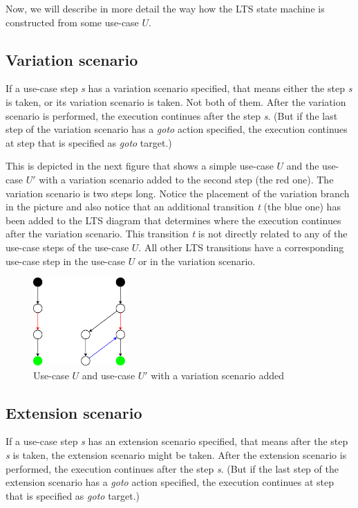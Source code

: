 Now, we will describe in more detail the way how the \ac{LTS} state machine is constructed from some use-case $U$.

\subsection{Variation scenario}
If a use-case step \emph{s} has a variation scenario specified, that means either the step \emph{s} is taken, or its variation scenario is
taken. Not both of them. After the variation scenario is performed, the execution continues after the step \emph{s}. (But if the
last step of the variation scenario has a \emph{goto} action specified, the execution continues at step that is specified as
\emph{goto} target.)

This is depicted in the next figure that shows a simple use-case $U$ and the use-case $U'$ with a variation
scenario added to the second step (the red one). The variation scenario is two steps long.
Notice the placement of the variation branch in the picture and also notice that an additional transition \emph{t} (the blue one)
has been added to the \ac{LTS} diagram that determines where the execution continues after the variation scenario. This transition
\emph{t} is not directly related to any of the use-case steps of the use-case $U$. All other \ac{LTS} transitions have a
corresponding use-case step in the use-case $U$ or in the variation scenario.

\begin{figure}[ht]
  \centering
  \includegraphics[width=100pt]{images/variation}
  \caption{Use-case $U$ and use-case $U'$ with a variation scenario added}
  \label{fig:VariationScenario}
\end{figure}

\subsection{Extension scenario}
If a use-case step \emph{s} has an extension scenario specified, that means after the step \emph{s} is taken, the extension scenario
might be taken. After the extension scenario is performed, the execution continues after the step \emph{s}. (But if the
last step of the extension scenario has a \emph{goto} action specified, the execution continues at step that is specified as
\emph{goto} target.)

